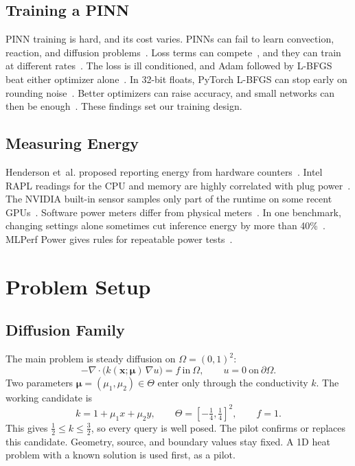 \documentclass[conference]{IEEEtran}
\begin{document}
\subsection{Training a PINN}
PINN training is hard, and its cost varies. PINNs can fail to learn convection, reaction, and diffusion problems~\cite{krishnapriyan2021}. Loss terms can compete~\cite{wang2021gradient}, and they can train at different rates~\cite{wang2022ntk}. The loss is ill conditioned, and Adam followed by L-BFGS beat either optimizer alone~\cite{rathore2024}. In 32-bit floats, PyTorch L-BFGS can stop early on rounding noise~\cite{xu2025}. Better optimizers can raise accuracy, and small networks can then be enough~\cite{urban2025,wang2025soap}. These findings set our training design.

\subsection{Measuring Energy}
Henderson et~al. proposed reporting energy from hardware counters~\cite{henderson2020}. Intel RAPL readings for the CPU and memory are highly correlated with plug power~\cite{khan2018}. The NVIDIA built-in sensor samples only part of the runtime on some recent GPUs~\cite{yang2024}. Software power meters differ from physical meters~\cite{jay2023,bouza2023}. In one benchmark, changing settings alone sometimes cut inference energy by more than 40\%~\cite{chung2025}. MLPerf Power gives rules for repeatable power tests~\cite{mlperfpower2025}.

\section{Problem Setup}\label{sec:setup}

\subsection{Diffusion Family}
The main problem is steady diffusion on $\Omega=(0,1)^2$:
\begin{equation}
-\nabla\cdot\bigl(k(\mathbf{x};\boldsymbol{\mu})\,\nabla u\bigr)=f \ \text{in}\ \Omega, \qquad u=0 \ \text{on}\ \partial\Omega.
\label{eq:pde}
\end{equation}
Two parameters $\boldsymbol{\mu}=(\mu_1,\mu_2)\in\Theta$ enter only through the conductivity $k$. The working candidate is
\begin{equation}
k=1+\mu_1x+\mu_2y,\qquad \Theta=\left[-\tfrac14,\tfrac14\right]^2,\qquad f=1.
\label{eq:k}
\end{equation}
This gives $\tfrac12\le k\le\tfrac32$, so every query is well posed. The pilot confirms or replaces this candidate. Geometry, source, and boundary values stay fixed. A 1D heat problem with a known solution is used first, as a pilot.
\end{document}
